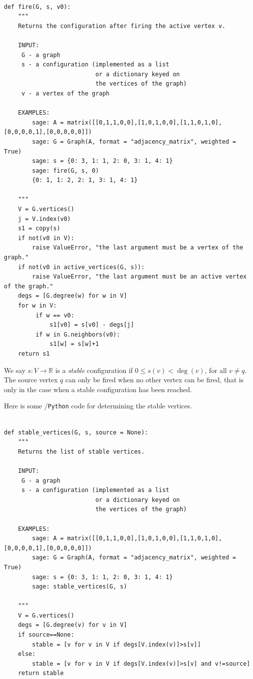 \begin{Verbatim}[fontsize=\scriptsize,fontfamily=courier,fontshape=tt,frame=single,label=\sage]

def fire(G, s, v0):
    """
    Returns the configuration after firing the active vertex v.

    INPUT:
     G - a graph
     s - a configuration (implemented as a list
                          or a dictionary keyed on
                          the vertices of the graph)
     v - a vertex of the graph

    EXAMPLES:
        sage: A = matrix([[0,1,1,0,0],[1,0,1,0,0],[1,1,0,1,0],[0,0,0,0,1],[0,0,0,0,0]])
        sage: G = Graph(A, format = "adjacency_matrix", weighted = True)
        sage: s = {0: 3, 1: 1, 2: 0, 3: 1, 4: 1}
        sage: fire(G, s, 0)
        {0: 1, 1: 2, 2: 1, 3: 1, 4: 1}

    """
    V = G.vertices()
    j = V.index(v0)
    s1 = copy(s)
    if not(v0 in V):
        raise ValueError, "the last argument must be a vertex of the graph."
    if not(v0 in active_vertices(G, s)):
        raise ValueError, "the last argument must be an active vertex of the graph."
    degs = [G.degree(w) for w in V]
    for w in V:
         if w == v0:
             s1[v0] = s[v0] - degs[j]
         if w in G.neighbors(v0):
             s1[w] = s[w]+1
    return s1

\end{Verbatim}
We say $s:V\to {\mathbb{R}}$ is a {\it stable} configuration
if $0\leq s(v)<\deg(v)$, for all $v\not= q$.
The source vertex $q$ can only be fired when
no other vertex can be fired, that is only in the case when
a stable configuration has been reached.

Here is some \sage/{\tt Python} code for determining the stable vertices.

\begin{Verbatim}[fontsize=\scriptsize,fontfamily=courier,fontshape=tt,frame=single,label=\sage]

def stable_vertices(G, s, source = None):
    """
    Returns the list of stable vertices.

    INPUT:
     G - a graph
     s - a configuration (implemented as a list
                          or a dictionary keyed on
                          the vertices of the graph)

    EXAMPLES:
        sage: A = matrix([[0,1,1,0,0],[1,0,1,0,0],[1,1,0,1,0],[0,0,0,0,1],[0,0,0,0,0]])
        sage: G = Graph(A, format = "adjacency_matrix", weighted = True)
        sage: s = {0: 3, 1: 1, 2: 0, 3: 1, 4: 1}
        sage: stable_vertices(G, s)

    """
    V = G.vertices()
    degs = [G.degree(v) for v in V]
    if source==None:
        stable = [v for v in V if degs[V.index(v)]>s[v]]
    else:
        stable = [v for v in V if degs[V.index(v)]>s[v] and v!=source]
    return stable

\end{Verbatim}

